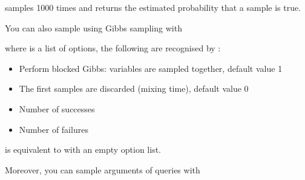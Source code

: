\documentclass[letterpaper,10pt,english]{sphinxmanual}
\begin{document}
\sphinxAtStartPar
samples  1000 times and returns the estimated probability that a sample is true.

\sphinxAtStartPar
You can also sample using Gibbs sampling with

\begin{sphinxVerbatim}[commandchars=\\\{\}]
  
\end{sphinxVerbatim}

\sphinxAtStartPar
where  is a list of options, the following are recognised by :
\begin{itemize}
\item {} 
\sphinxAtStartPar
{} Perform blocked Gibbs:  variables are sampled together, default value 1

\item {} 
\sphinxAtStartPar
{} The first  samples are discarded (mixing time), default value 0

\item {} 
\sphinxAtStartPar
{} Number of successes

\item {} 
\sphinxAtStartPar
{} Number of failures

\end{itemize}

\sphinxAtStartPar
{} is equivalent to  with an empty option list.

\sphinxAtStartPar
Moreover, you can sample arguments of queries with

\begin{sphinxVerbatim}[commandchars=\\\{\}]
  
\end{sphinxVerbatim}
\end{document}
